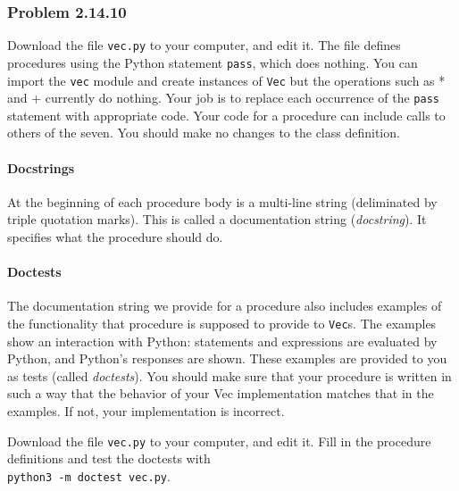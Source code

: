 \documentclass[
  letterpaper,
  DIV=11,
  numbers=noendperiod]{scrartcl}
\let\oldparagraph\paragraph
\renewcommand{\paragraph}[1]{\oldparagraph{#1}\mbox{}}
\begin{document}
\hypertarget{problem-2.14.10}{%
\subsubsection{Problem 2.14.10}\label{problem-2.14.10}}

Download the file \texttt{vec.py} to your computer, and edit it. The
file defines procedures using the Python statement \texttt{pass}, which
does nothing. You can import the \texttt{vec} module and create
instances of \texttt{Vec} but the operations such as * and + currently
do nothing. Your job is to replace each occurrence of the \texttt{pass}
statement with appropriate code. Your code for a procedure can include
calls to others of the seven. You should make no changes to the class
definition.

\hypertarget{docstrings}{%
\paragraph{Docstrings}\label{docstrings}}

At the beginning of each procedure body is a multi-line string
(deliminated by triple quotation marks). This is called a documentation
string (\emph{docstring}). It specifies what the procedure should do.

\hypertarget{doctests}{%
\paragraph{Doctests}\label{doctests}}

The documentation string we provide for a procedure also includes
examples of the functionality that procedure is supposed to provide to
\texttt{Vec}s. The examples show an interaction with Python: statements
and expressions are evaluated by Python, and Python's responses are
shown. These examples are provided to you as tests (called
\emph{doctests}). You should make sure that your procedure is written in
such a way that the behavior of your Vec implementation matches that in
the examples. If not, your implementation is incorrect.

Download the file \texttt{vec.py} to your computer, and edit it. Fill in
the procedure definitions and test the doctests with\\
\texttt{python3\ -m\ doctest\ vec.py}.
\end{document}
